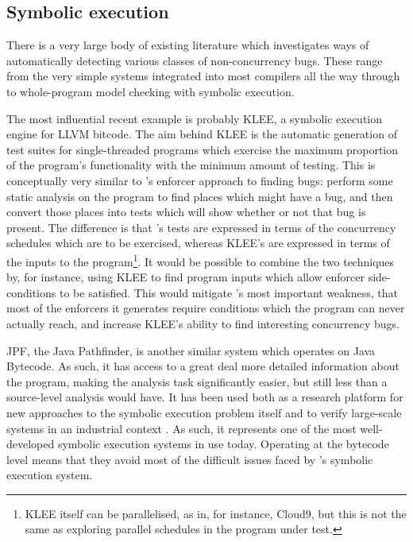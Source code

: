 \subsection{Symbolic execution}

There is a very large body of existing literature which investigates
ways of automatically detecting various classes of non-concurrency
bugs.  These range from the very simple systems integrated into most
compilers\needCite{} all the way through to whole-program model
checking with symbolic execution\cite{Ball2011}.  

The most influential recent example is probably KLEE\cite{Cadar}, a
symbolic execution engine for LLVM bitcode\cite{Lattner2013}.  The aim
behind KLEE is the automatic generation of test suites for
single-threaded programs which exercise the maximum proportion of the
program's functionality with the minimum amount of testing.  This is
conceptually very similar to {\technique}'s enforcer approach to
finding bugs: perform some static analysis on the program to find
places which might have a bug, and then convert those places into
tests which will show whether or not that bug is present.  The
difference is that {\technique}'s tests are expressed in terms of the
concurrency schedules which are to be exercised, whereas KLEE's are
expressed in terms of the inputs to the program\footnote{KLEE itself
  can be parallelised, as in, for instance, Cloud9\cite{Ciortea2010},
  but this is not the same as exploring parallel schedules in the
  program under test.}.  It would be possible to combine the two
techniques by, for instance, using KLEE to find program inputs which
allow {\technique} enforcer side-conditions to be satisfied.  This
would mitigate {\technique}'s most important weakness, that most of
the enforcers it generates require conditions which the program can
never actually reach, and increase KLEE's ability to find interesting
concurrency bugs.


JPF, the Java Pathfinder\cite{Havelund2000}, is another similar system
which operates on Java Bytecode\cite{Lindholm2013}.  As such, it has
access to a great deal more detailed information about the program,
making the analysis task significantly easier, but still less than a
source-level analysis would have.  It has been used both as a research
platform for new approaches to the symbolic execution problem itself
 and to verify
large-scale systems in an industrial context .
As such, it represents one of the most well-developed symbolic
execution systems in use today.  Operating at the bytecode level means
that they avoid most of the difficult issues faced by {\technique}'s
symbolic execution system.

